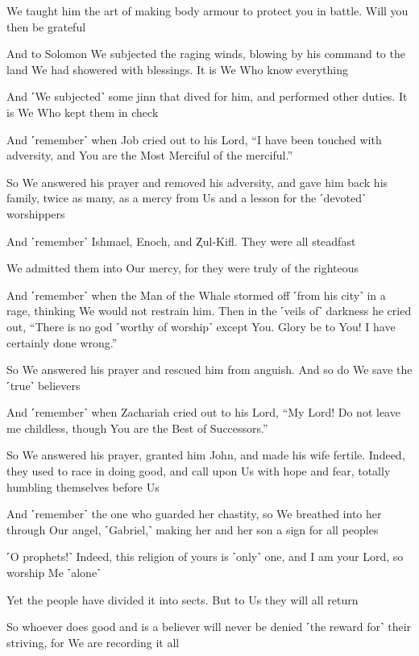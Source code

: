 We taught him the art of making body armour to protect you in battle. Will you then be grateful

And to Solomon We subjected the raging winds, blowing by his command to the land We had showered with blessings. It is We Who know everything

And ˹We subjected˺ some jinn that dived for him, and performed other duties. It is We Who kept them in check

And ˹remember˺ when Job cried out to his Lord, “I have been touched with adversity, and You are the Most Merciful of the merciful.”

So We answered his prayer and removed his adversity, and gave him back his family, twice as many, as a mercy from Us and a lesson for the ˹devoted˺ worshippers

And ˹remember˺ Ishmael, Enoch, and Ⱬul-Kifl. They were all steadfast

We admitted them into Our mercy, for they were truly of the righteous

And ˹remember˺ when the Man of the Whale stormed off ˹from his city˺ in a rage, thinking We would not restrain him. Then in the ˹veils of˺ darkness he cried out, “There is no god ˹worthy of worship˺ except You. Glory be to You! I have certainly done wrong.”

So We answered his prayer and rescued him from anguish. And so do We save the ˹true˺ believers

And ˹remember˺ when Zachariah cried out to his Lord, “My Lord! Do not leave me childless, though You are the Best of Successors.”

So We answered his prayer, granted him John, and made his wife fertile. Indeed, they used to race in doing good, and call upon Us with hope and fear, totally humbling themselves before Us

And ˹remember˺ the one who guarded her chastity, so We breathed into her through Our angel, ˹Gabriel,˺ making her and her son a sign for all peoples

˹O prophets!˺ Indeed, this religion of yours is ˹only˺ one, and I am your Lord, so worship Me ˹alone˺

Yet the people have divided it into sects. But to Us they will all return

So whoever does good and is a believer will never be denied ˹the reward for˺ their striving, for We are recording it all

